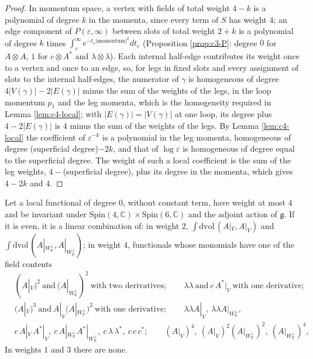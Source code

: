\begin{proof}
In momentum space, a vertex with fields of total weight $4-k$ is a polynomial of degree $k$ in the momenta, since every term of $S$ has weight $4$; an edge component of $P(\varepsilon,\infty)$ between slots of total weight $2+k$ is a polynomial of degree $k$ times $\int_\varepsilon^\infty e^{-t_e|\text{momentum}|^2}dt_e$ (Proposition \ref{prop:c3-P}: degree $0$ for $A\otimes A$, $1$ for $c\otimes A^*$ and $\lambda\otimes\lambda$). Each internal half-edge contributes its weight once to a vertex and once to an edge, so, for legs in fixed slots and every assignment of slots to the internal half-edges, the numerator of $\gamma$ is homogeneous of degree $4|V(\gamma)|-2|E(\gamma)|$ minus the sum of the weights of the legs, in the loop momentum $p_1$ and the leg momenta, which is the homogeneity required in Lemma \ref{lem:c4-local}; with $|E(\gamma)|=|V(\gamma)|$ at one loop, its degree plus $4-2|E(\gamma)|$ is $4$ minus the sum of the weights of the legs. By Lemma \ref{lem:c4-local} the coefficient of $\varepsilon^{-k}$ is a polynomial in the leg momenta, homogeneous of degree (superficial degree)$-2k$, and that of $\log\varepsilon$ is homogeneous of degree equal to the superficial degree. The weight of such a local coefficient is the sum of the leg weights, $4-$(superficial degree), plus its degree in the momenta, which gives $4-2k$ and $4$.
\end{proof}

\begin{lemma}
\label{lem:c4-enumeration}
Let a local functional of degree $0$, without constant term, have weight at most $4$ and be invariant under $\mathrm{Spin}(4,\mathbb C)\times\mathrm{Spin}(6,\mathbb C)$ and the adjoint action of $\mathfrak g$. If it is even, it is a linear combination of: in weight $2$, $\int\mathrm{dvol}\,(A|_V,A|_V)$ and $\int\mathrm{dvol}\,(A|_{W_{\mathbb R}^\perp},A|_{W_{\mathbb R}^\perp})$; in weight $4$, functionals whose monomials have one of the field contents
\[
\begin{aligned}
&(A|_V)^2\ \text{and}\ (A|_{W_{\mathbb R}^\perp})^2\ \text{with two derivatives};\qquad \lambda\lambda\ \text{and}\ c\,A^*|_V\ \text{with one derivative};\\
&(A|_V)^3\ \text{and}\ A|_V(A|_{W_{\mathbb R}^\perp})^2\ \text{with one derivative};\qquad \lambda\lambda A|_V,\ \lambda\lambda A|_{W_{\mathbb R}^\perp},\\
&c\,A|_V\,A^*|_V,\ c\,A|_{W_{\mathbb R}^\perp}A^*|_{W_{\mathbb R}^\perp},\ c\,\lambda\,\lambda^*,\ c\,c\,c^*;\qquad (A|_V)^4,\ (A|_V)^2(A|_{W_{\mathbb R}^\perp})^2,\ (A|_{W_{\mathbb R}^\perp})^4,
\end{aligned}
\]
In weights $1$ and $3$ there are none.
\end{lemma}

